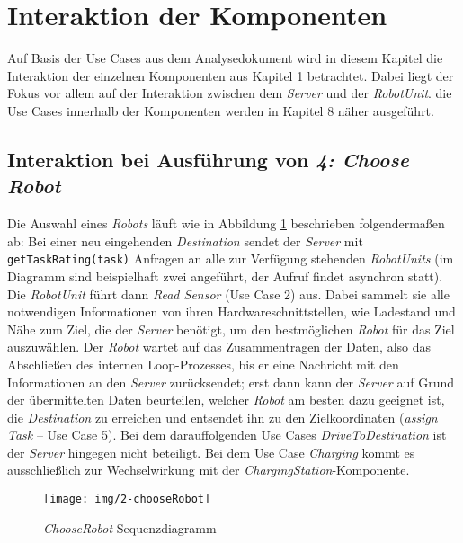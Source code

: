 \section{Interaktion der Komponenten}
Auf Basis der Use Cases aus dem Analysedokument wird in diesem Kapitel die Interaktion der einzelnen Komponenten aus Kapitel 1 betrachtet. Dabei liegt der Fokus vor allem auf der Interaktion zwischen dem \emph{Server} und der \emph{RobotUnit}. die Use Cases innerhalb der Komponenten werden in Kapitel 8 näher ausgeführt.\\


\subsection*{Interaktion bei Ausführung von \emph{4: Choose Robot}}

Die Auswahl eines \emph{Robots} läuft wie in Abbildung \ref{SequenzDiagrammInteraktion} beschrieben folgendermaßen ab: Bei einer neu eingehenden \emph{Destination} sendet der \emph{Server} mit \texttt{getTaskRating(task)} Anfragen an alle zur Verfügung stehenden \emph{RobotUnits} (im Diagramm sind beispielhaft zwei angeführt, der Aufruf findet asynchron statt). Die \emph{RobotUnit} führt dann \emph{Read Sensor} (Use Case 2) aus. Dabei sammelt sie alle notwendigen Informationen von ihren Hardwareschnittstellen, wie Ladestand und Nähe zum Ziel, die der \emph{Server} benötigt, um den bestmöglichen \emph{Robot} für das Ziel auszuwählen. Der \emph{Robot} wartet auf das Zusammentragen der Daten, also das Abschließen des internen Loop-Prozesses, bis er eine Nachricht mit den Informationen an den \emph{Server} zurücksendet; erst dann kann der \emph{Server} auf Grund der übermittelten Daten beurteilen, welcher \emph{Robot} am besten dazu geeignet ist, die \emph{Destination} zu erreichen und entsendet ihn zu den Zielkoordinaten (\emph{assign Task} – Use Case 5). Bei dem darauffolgenden Use Cases \emph{DriveToDestination} ist der \emph{Server} hingegen nicht beteiligt. Bei dem Use Case \emph{Charging} kommt es ausschließlich zur Wechselwirkung mit der \emph{ChargingStation}-Komponente.

\begin{figure}[H]
	\centering
	\texttt{[image: img/2-chooseRobot]}
	\caption{\emph{ChooseRobot}-Sequenzdiagramm}
	\label{SequenzDiagrammInteraktion}
\end{figure}

